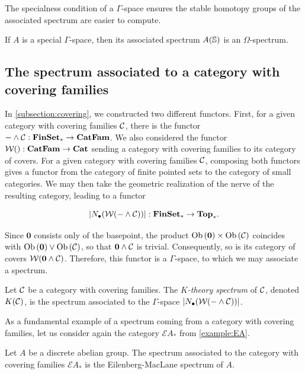 The specialness condition of a $\Gamma$-space ensures the stable homotopy groups of the associated spectrum are easier to compute.

\begin{proposition}
    If $A$ is a special $\Gamma$-space, then its associated spectrum $A(\mathbb{S})$ is an $\Omega$-spectrum.
\end{proposition}

\subsection{The spectrum associated to a category with covering families}

In \cref{subsection:covering}, we constructed two different functors. First, for a given category with covering families $\mathcal{C}$, there is the functor $- \wedge \mathcal{C} : \textbf{FinSet}_* \to \textbf{CatFam}$. We also considered the functor $\mathcal{W}\lparen  \rparen : \textbf{CatFam} \to \textbf{Cat}$ sending a category with covering families to its category of covers. For a given category with covering families $\mathcal{C}$, composing both functors gives a functor from the category of finite pointed sets to the category of small categories. We may then take the geometric realization of the nerve of the resulting category, leading to a functor

\[ \left| N_{\bullet}(\mathcal{W}\lparen - \wedge \mathcal{C} \rparen) \right| : \textbf{FinSet}_* \to \textbf{Top}_*. \]

Since $\textbf{0}$ consists only of the basepoint, the product $\operatorname{Ob}{\lparen \textbf{0} \rparen} \times \operatorname{Ob}{\lparen \mathcal{C} \rparen}$ coincides with $\operatorname{Ob}{\lparen \textbf{0} \rparen} \vee \operatorname{Ob}{\lparen \mathcal{C} \rparen}$, so that $\textbf{0} \wedge \mathcal{C}$ is trivial. Consequently, so is its category of covers $\mathcal{W}\lparen \textbf{0} \wedge \mathcal{C} \rparen$. Therefore, this functor  is a $\Gamma$-space, to which we may associate a spectrum. 

\begin{definition}
    Let $\mathcal{C}$ be a category with covering families. The \emph{$K$-theory spectrum} of $\mathcal{C}$, denoted $K(\mathcal{C})$, is the spectrum associated to the $\Gamma$-space $\left| N_{\bullet}(\mathcal{W}\lparen - \wedge \mathcal{C} \rparen) \right|$.
\end{definition}


As a fundamental example of a spectrum coming from a category with covering families, let us consider again the category $\mathcal{E} A_*$ from \cref{example:EA}.

\begin{proposition}\label{prop:EM-spectrum}
    Let $A$ be a discrete abelian group. The spectrum associated to the category with covering families $\mathcal{E} A_*$ is the Eilenberg-MacLane spectrum of $A$.
\end{proposition}

